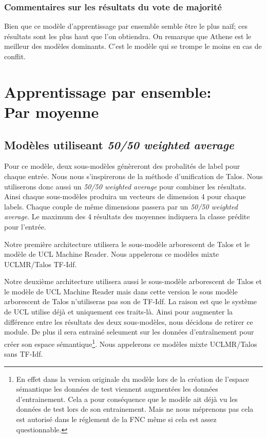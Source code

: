 \documentclass[onecolumn, 12pt]{article}
\begin{document}
\subsubsection{Commentaires sur les résultats du vote de majorité}
Bien que ce modèle d'apprentissage par ensemble semble être le plus naïf; ces résultats sont les plus haut que l'on obtiendra.
On remarque que Athene est le meilleur des modèles dominants.
C'est le modèle qui se trompe le moins en cas de conflit.



\section{Apprentissage par ensemble: \\ Par moyenne}

\subsection{Modèles utiliseant \textit{50/50 weighted average}}

Pour ce modèle, deux sous-modèles  génèreront des probalités de label pour chaque entrée.
Nous nous s'inspirerons de la méthode d'unification de Talos.
Nous utiliserons donc aussi un \textit{50/50 weighted average} pour combiner les résultats.
Ainsi chaque sous-modèles produira un vecteurs de dimension 4 pour chaque labels.
Chaque couple de même dimensions passera par un \textit{50/50 weighted average}.
Le maximum des 4 résultats des moyennes indiquera la classe prédite pour l'entrée.

Notre première architecture utilisera le sous-modèle arborescent de Talos et le modèle de UCL Machine Reader.
Nous appelerons ce modèles \og mixte UCLMR/Talos TF-Idf\fg.

Notre deuxième architecture utilisera aussi le sous-modèle arborescent de Talos et le modèle de UCL Machine Reader mais dans cette version le sous modèle arborescent de Talos n'utiliseras pas son de TF-Idf. La raison est que le système de UCL utilise déjà et uniquement ces traits-là. Ainsi pour augmenter la différence entre les résultats des deux sous-modèles, nous décidons de retirer ce module. De plus il sera entrainé seleument sur les données d'entraînement pour créer son espace sémantique\footnote{En effet dans la version originale du modèle lors de la création de l'espace sémantique les données de test viennent augmentées les données d'entrainement. Cela a pour conséquence que le modèle ait déjà vu les données de test lors de son entrainement. Mais ne nous méprenons pas cela est autorisé dans le réglement de la FNC même si cela est assez questionnable.}.
Nous appelerons ce modèles \og mixte UCLMR/Talos sans TF-Idf\fg.
\end{document}
